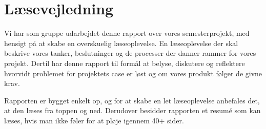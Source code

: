 \clearpage
\section{Læsevejledning}
Vi har som gruppe udarbejdet denne rapport over vores semesterprojekt, med hensigt på at skabe en overskuelig læseoplevelse. En læseoplevelse der skal beskrive vores tanker, beslutninger og de processer der danner rammer for vores projekt. Dertil har denne rapport til formål at belyse, diskutere og reflektere hvorvidt problemet for projektets case er løst og om vores produkt følger de givne krav.

Rapporten er bygget enkelt op, og for at skabe en let læseoplevelse anbefales det, at den læses fra toppen og ned. Derudover besidder rapporten et resumé som kan læses, hvis man ikke føler for at pløje igennem 40+ sider.